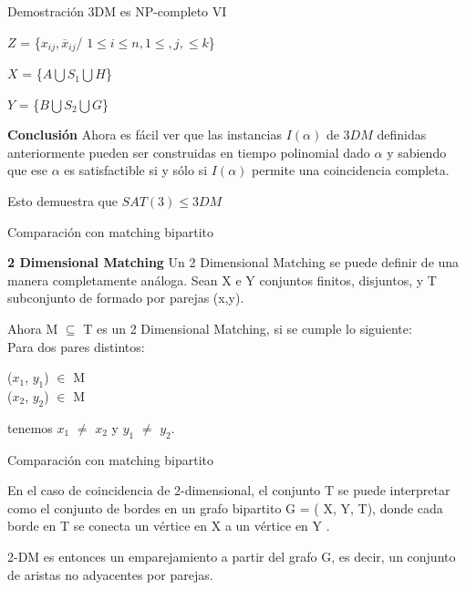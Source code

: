 \documentclass[10pt, mathserif, profesionalfont]{beamer}
\begin{document}
	
	\begin{frame}{Demostración 3DM es NP-completo VI}
		
		\begin{block}{}
			 $Z$ = \{$x_{ij}, \overline x_{ij}$/ $1 \leq i \leq n, 1 \leq, j, \leq k$\}
			 
			 $X$ = \{$A \bigcup S_1 \bigcup H$\}
			 
			 $Y$ = \{$B \bigcup S_2 \bigcup G$\}
			
		\end{block}
		\begin{block}{\textbf{Conclusión}}
			Ahora es fácil ver que las instancias $I(\alpha)$ de $3DM$ definidas anteriormente pueden ser construidas en tiempo 
			polinomial dado $\alpha$ y sabiendo que ese $\alpha$ es satisfactible si y sólo si $I(\alpha)$ permite una coincidencia
			completa. 
			
		\end{block}
		
		\begin{block}{}
			Esto demuestra que $SAT(3) \leq 3DM$
		\end{block}
		
	\end{frame}
	
	
	\begin{frame}{Comparación con matching bipartito}
		
		\begin{block}{\textbf{2 Dimensional Matching}}
			Un 2 Dimensional Matching se puede definir de una manera completamente análoga. Sean X e Y  conjuntos finitos, disjuntos, y T  subconjunto de formado por parejas (x,y). 
		\end{block}
	
		\begin{block}{}
			Ahora M  $\subseteq$ T es un 2 Dimensional Matching, si se cumple lo siguiente: 
			\\Para dos pares distintos:
			\begin{center}
				($x_1$, $y_1$) $\in$  M 
				\\($x_2$, $y_2$) $\in$  M
			\end{center}
			tenemos $x_1$ $\neq$  $x_2$ y $y_1$  $\neq$  $y_2$.
		\end{block}	
				
	\end{frame}


	\begin{frame}{Comparación con matching bipartito}
		
			\begin{block}{}
				En el caso de coincidencia de 2-dimensional, el conjunto T se puede interpretar como el conjunto de bordes en un grafo bipartito G = ( X,  Y,  T), donde cada borde en T se conecta un vértice en X a un vértice en Y . 
			\end{block}	
		
			\begin{block}{}
				2-DM es entonces un emparejamiento a partir del grafo G, es decir, un conjunto de aristas no adyacentes por parejas.
			\end{block}
		
	\end{frame}
\end{document}
